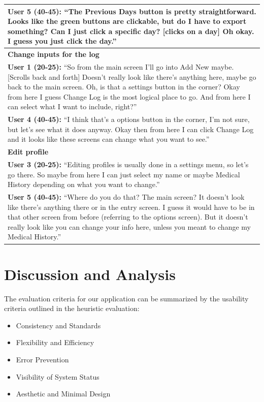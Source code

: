 \documentclass[pdftex,12pt,a4paper]{report}
\begin{document}
\begin{center}
\begin{tabular}{|p{\textwidth}|}
	\textbf{User 5 (40-45):} ``The Previous Days button is pretty straightforward. Looks like the green buttons are clickable, but do I have to export something? Can I just click a specific day? [clicks on a day] Oh okay. I guess you just click the day.''\\
	\hline
	\textbf{Change inputs for the log}\\
	\textbf{User 1 (20-25):} ``So from the main screen I'll go into Add New maybe. [Scrolls back and forth] Doesn't really look like there's anything here, maybe go back to the main screen. Oh, is that a settings button in the corner? Okay from here I guess Change Log is the most logical place to go. And from here I can select what I want to include, right?''\\
	\textbf{User 4 (40-45):} ``I think that's a options button in the corner, I'm not sure, but let's see what it does anyway. Okay then from here I can click Change Log and it looks like these screens can change what you want to see.''\\
	\hline
	\textbf{Edit profile}\\
	\textbf{User 3 (20-25):} ``Editing profiles is usually done in a settings menu, so let's go there. So maybe from here I can just select my name or maybe Medical History depending on what you want to change.''\\
	\textbf{User 5 (40-45):} ``Where do you do that? The main screen? It doesn't look like there's anything there or in the entry screen. I guess it would have to be in that other screen from before (referring to the options screen). But it doesn't really look like you can change your info here, unless you meant to change my Medical History.''\\
	\hline
	\end{tabular}
\end{center}

\chapter{Discussion and Analysis}
The evaluation criteria for our application can be summarized by the usability criteria outlined in the heuristic evaluation:
\begin{itemize}
\item{Consistency and Standards}
\item{Flexibility and Efficiency}
\item{Error Prevention}
\item{Visibility of System Status}
\item{Aesthetic and Minimal Design}
\end{itemize}
\end{document}
